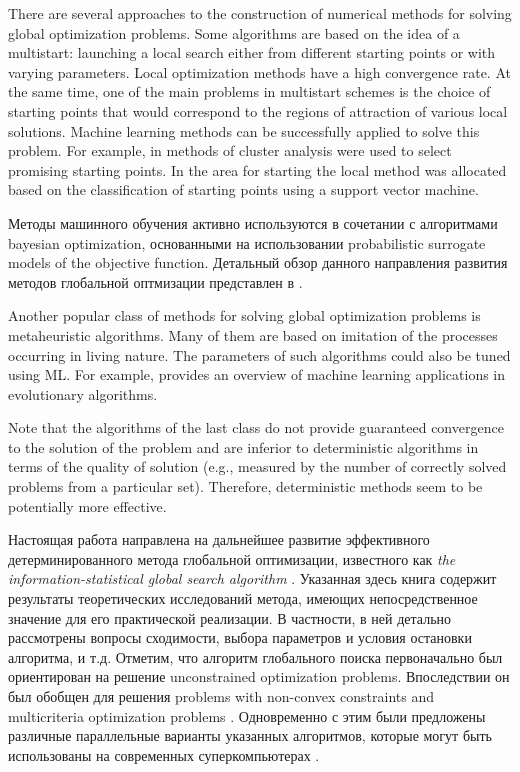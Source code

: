 \documentclass[entropy,article,submit,moreauthors,pdftex]{Definitions/mdpi}
\begin{document}
There are several approaches to the construction of numerical methods for solving global optimization problems. 
Some algorithms are based on the idea of a multistart: launching a local search either from different starting points or with varying parameters. Local optimization methods have a high convergence rate. At the same time, one of the main problems in multistart schemes is the choice of starting points that would correspond to the regions of attraction of various local solutions. 
Machine learning methods can be successfully applied to solve this problem.  
For example, in \cite{RinnooyKan1987} methods of cluster analysis were used to select promising starting points.
In \cite{Cassioli2012} the area for starting the local method was allocated based on the classification of starting points using a support vector machine.

Методы машинного обучения активно используются в сочетании с алгоритмами bayesian optimization, основанными на использовании probabilistic surrogate models of the objective function. Детальный обзор данного направления развития методов глобальной оптмизации представлен в \cite{Archetti2019,Zhigljavsky2021}.

Another popular class of methods for solving global optimization problems is metaheuristic algorithms. 
Many of them are based on imitation of the processes occurring in living nature. The parameters of such algorithms could also be tuned using ML. For example, \cite{Jin2005} provides an overview of machine learning applications in evolutionary algorithms.

Note that the algorithms of the last class do not provide guaranteed convergence to the solution of the problem and are inferior to deterministic algorithms in terms of the quality of solution \cite{Kvasov2018,Sergeyev2018} (e.g., measured by the number of correctly solved problems from a particular set). Therefore, deterministic methods seem to be potentially more effective.

Настоящая работа направлена на дальнейшее развитие эффективного детерминированного метода глобальной оптимизации, известного как \textit{the information-statistical global search algorithm} \cite{Strongin2000}. Указанная здесь книга содержит результаты теоретических исследований метода, имеющих непосредственное значение для его практической реализации. В частности, в ней детально рассмотрены вопросы сходимости, выбора параметров и условия остановки алгоритма, и т.д.
Отметим, что алгоритм глобального поиска первоначально был ориентирован на решение unconstrained optimization problems. Впоследствии он был обобщен для решения problems with non-convex constraints\cite{Barkalov2002} and multicriteria optimization problems \cite{Gergel2020}.
Одновременно с этим были предложены различные параллельные варианты указанных алгоритмов, которые могут быть использованы на современных суперкомпьютерах \cite{Barkalov2016,globalizerSystem,Strongin2018}.
\end{document}
